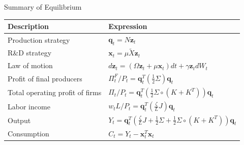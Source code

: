 \documentclass[
  10pt,               %
  aspectratio=169,    %
  handout             %
]{beamer}
\theoremstyle{plain}
\begin{document}
%
\begin{frame}{Summary of Equilibrium}
  \begin{center}
    \label{summary}%
    \begin{tabular}{ll}
      Description                     & Expression\tabularnewline
      \hline
      Production strategy             & $\bm{q}_{t}=N\bm{z}_{t}$\tabularnewline
      R\&D strategy                   & $\bm{x}_{t}=\mu\tilde{X}\bm{z}_{t}$\tabularnewline
      Law of motion                   & $d\bm{z}_{t}=\left(\Omega\bm{z}_{t}+\mu\bm{x}_{t}\right)dt+\gamma\bm{z}_{t}dW_{t}$\tabularnewline
      Profit of final producers       & $\Pi_{t}^{F}/P_{t}=\bm{q}_{t}^{T}\left(\frac{1}{2}\Sigma\right)\bm{q}_{t}$\tabularnewline
      Total operating profit of firms & $\Pi_{t}/P_{t}=\bm{q}_{t}^{T}\left(\frac{1}{2}\Sigma\circ\left(K+K^{T}\right)\right)\bm{q}_{t}$\tabularnewline
      Labor income                    & $w_{t}L/P_{t}=\bm{q}_{t}^{T}\left(\frac{\zeta}{L}J\right)\bm{q}_{t}$\tabularnewline
      Output                          & $Y_{t}=\bm{q}_{t}^{T}\left(\frac{\zeta}{L}J+\frac{1}{2}\Sigma+\frac{1}{2}\Sigma\circ\left(K+K^{T}\right)\right)\bm{q}_{t}$\tabularnewline
      Consumption                     & $C_{t}=Y_{t}-\bm{x}_{t}^{T}\bm{x}_{t}$\tabularnewline
    \end{tabular}
    \par\end{center}

  \hyperlink{aggregation}{}
\end{frame}
\end{document}
